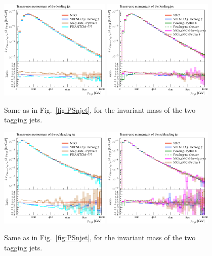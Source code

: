 \begin{figure}[hbt]
\centering
\includegraphics[width=0.47\textwidth]{figures/LOPS/pT_j1.pdf}
\includegraphics[width=0.47\textwidth]{figures/NLOPS/pT_j1.pdf}
\caption{Same as in Fig.~\protect\ref{fig:PSnjet}, for the invariant mass of the two tagging jets.}
\label{fig:PSpt1}
\end{figure}

\begin{figure}[hbt]
\centering
\includegraphics[width=0.47\textwidth]{figures/LOPS/pT_j2.pdf}
\includegraphics[width=0.47\textwidth]{figures/NLOPS/pT_j2.pdf}
\caption{Same as in Fig.~\protect\ref{fig:PSnjet}, for the invariant mass of the two tagging jets.}
\label{fig:PSpt2}
\end{figure}

